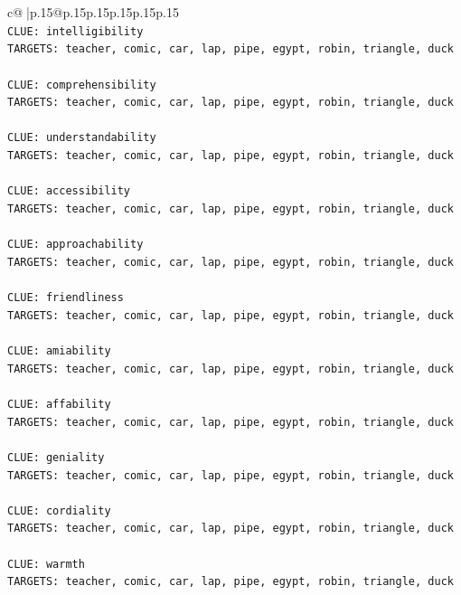 \documentclass{article}
\begin{document}
{\begin{supertabular}{c@{$\;$}|p{.15\linewidth}@{}p{.15\linewidth}p{.15\linewidth}p{.15\linewidth}p{.15\linewidth}p{.15\linewidth}}
{{{\\ 
\texttt{CLUE: intelligibility} \\
\texttt{TARGETS: teacher, comic, car, lap, pipe, egypt, robin, triangle, duck} \\
\\ 
\texttt{CLUE: comprehensibility} \\
\texttt{TARGETS: teacher, comic, car, lap, pipe, egypt, robin, triangle, duck} \\
\\ 
\texttt{CLUE: understandability} \\
\texttt{TARGETS: teacher, comic, car, lap, pipe, egypt, robin, triangle, duck} \\
\\ 
\texttt{CLUE: accessibility} \\
\texttt{TARGETS: teacher, comic, car, lap, pipe, egypt, robin, triangle, duck} \\
\\ 
\texttt{CLUE: approachability} \\
\texttt{TARGETS: teacher, comic, car, lap, pipe, egypt, robin, triangle, duck} \\
\\ 
\texttt{CLUE: friendliness} \\
\texttt{TARGETS: teacher, comic, car, lap, pipe, egypt, robin, triangle, duck} \\
\\ 
\texttt{CLUE: amiability} \\
\texttt{TARGETS: teacher, comic, car, lap, pipe, egypt, robin, triangle, duck} \\
\\ 
\texttt{CLUE: affability} \\
\texttt{TARGETS: teacher, comic, car, lap, pipe, egypt, robin, triangle, duck} \\
\\ 
\texttt{CLUE: geniality} \\
\texttt{TARGETS: teacher, comic, car, lap, pipe, egypt, robin, triangle, duck} \\
\\ 
\texttt{CLUE: cordiality} \\
\texttt{TARGETS: teacher, comic, car, lap, pipe, egypt, robin, triangle, duck} \\
\\ 
\texttt{CLUE: warmth} \\
\texttt{TARGETS: teacher, comic, car, lap, pipe, egypt, robin, triangle, duck} \\
}}}
\end{supertabular}}
\end{document}
